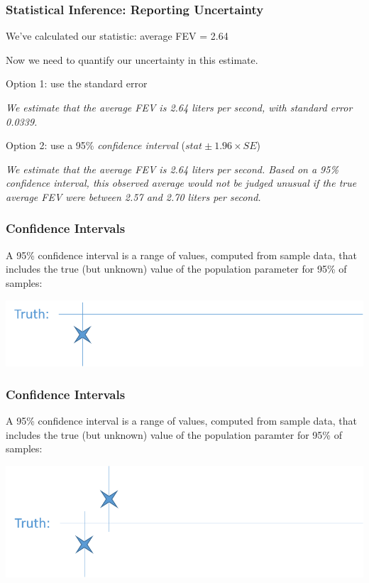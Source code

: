 \documentclass[12pt, 
hyperref={colorlinks=true, linkcolor=blue, urlcolor=cyan}]{beamer}
\begin{document}
\begin{frame}
\frametitle{Statistical Inference: Reporting Uncertainty}

We've calculated our statistic: average FEV = 2.64

Now we need to quantify our uncertainty in this estimate. 

\color{blue}Option 1: \color{black} use the standard error \vspace{-0.2cm} 

\textit{We estimate that the average FEV is 2.64 liters per second, with standard error 0.0339.} \pause


\color{blue}Option 2: \color{black} use a 95\% \textit{confidence interval} ($stat \pm 1.96 \times SE$) \vspace{-0.2cm} 

\textit{We estimate that the average FEV is 2.64 liters per second. Based on a 95\% confidence interval, this observed average would not be judged unusual if the true average FEV were between 2.57 and 2.70 liters per second.} %

\end{frame}

\begin{frame}
\frametitle{Confidence Intervals}

A 95\% confidence interval is a range of values, computed from sample data, that includes the true (but unknown) value of the population parameter for 95\% of samples:

\includegraphics[width=\textwidth]{./ci_1} 
\end{frame}

\begin{frame}[noframenumbering]
\frametitle{Confidence Intervals}

A 95\% confidence interval is a range of values, computed from sample data, that includes the true (but unknown) value of the population paramter for 95\% of samples:

\includegraphics[width=\textwidth]{./ci_2} 
\end{frame}
\end{document}
